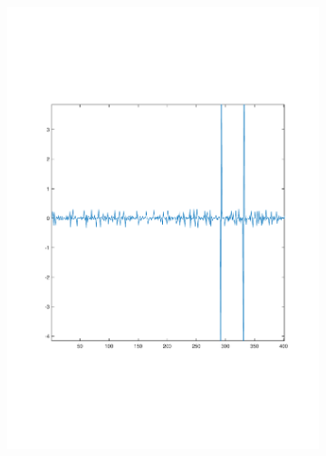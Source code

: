 \documentclass[sigconf]{acmart}
\begin{document}
\begin{figure}[!htp]
\begin{subfigure}[t]{0.4\linewidth}
		\includegraphics[width=0.95\linewidth, trim={100 100 0 0}, clip=true]{fig/RTT_21}
		\label{fig:3.3c}
	\end{subfigure}
	\begin{subfigure}[t]{0.4\linewidth}
		\centering

\end{subfigure}
\end{figure}
\end{document}
